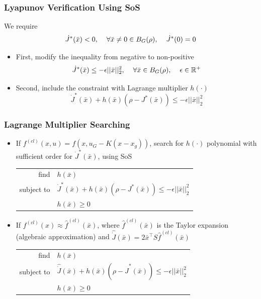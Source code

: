 \documentclass{beamer}
\begin{document}

\begin{frame}
\frametitle{Lyapunov Verification Using SoS}
We require 
\begin{equation*}
\dot{J}^{\ast}(\bar{x})<0, \hspace{.4cm} \forall\bar{x} \neq 0 \in B_G(\rho), \hspace{.4cm} \dot{J}^{\ast}(0)=0
\end{equation*} 
\begin{itemize}
\item First, modify the inequality from negative to non-positive 
\begin{equation*}
\dot{J}^{\ast}(\bar{x})\leq -\epsilon ||\bar{x}||_2^2, \hspace{.4cm} \forall \bar{x}\in B_G(\rho),\hspace{.4cm} \epsilon \in \mathbb{R}^+
\end{equation*}
\item Second, include the constraint with Lagrange multiplier $h(\cdot)$
\begin{equation*}
\dot{J}^{\ast}(\bar{x})+ h(\bar{x})(\rho - J^{\ast}(\bar{x}))\leq -\epsilon ||\bar{x}||_2^2
\end{equation*}
\end{itemize}
\end{frame}


\begin{frame}
\frametitle{Lagrange Multiplier Searching}
\begin{itemize}
\item If $f^{(cl)}(x,u)=f(x,u_G-K(x-x_g))$, search for $h(\cdot)$ polynomial with sufficient order for $\dot{J}^{\ast}(\bar{x})$, using SoS
\begin{center}
\begin{tabular}{ r l }
find & $h(\bar{x})$ \\
subject to & $\dot{J}^{\ast}(\bar{x})+ h(\bar{x})(\rho - J^{\ast}(\bar{x}))\leq -\epsilon ||\bar{x}||_2^2$\\
 & $h(\bar{x})\geq 0$
\end{tabular}
\end{center}\vspace{.2cm}
\item If $f^{(cl)}(x)\approx \hat{f}^{(cl)}(\bar{x})$, where $\hat{f}^{(cl)}(\bar{x})$ is the Taylor expansion (algebraic approximation) and $\hat{\dot{J}}(\bar{x})=2\bar{x}^{\intercal}S\hat{f}^{(cl)}(\bar{x})$
\begin{center}
\begin{tabular}{ r l }
find & $h(\bar{x})$ \\
subject to & $\hat{\dot{J}}(\bar{x})+ h(\bar{x})(\rho - \hat{J}^{\ast}(\bar{x}))\leq -\epsilon ||\bar{x}||_2^2$\\
 & $h(\bar{x})\geq 0$
\end{tabular}
\end{center}
\end{itemize}

\end{frame}
\end{document}
